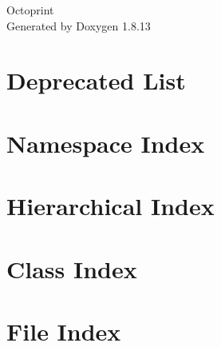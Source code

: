 \documentclass[twoside]{book}
\newcommand{\+}{\discretionary{\mbox{\scriptsize$\hookleftarrow$}}{}{}}
\newcommand{\clearemptydoublepage}{%
  \newpage{\pagestyle{empty}\cleardoublepage}%
}
\begin{document}
\hypersetup{pageanchor=false,
             bookmarksnumbered=true,
             pdfencoding=unicode
            }
\begin{titlepage}
\vspace*{7cm}
\begin{center}%
{\Large Octoprint }\\
\vspace*{1cm}
{\large Generated by Doxygen 1.8.13}\\
\end{center}
\end{titlepage}
\clearemptydoublepage
{}
\tableofcontents
\clearemptydoublepage
{}
\hypersetup{pageanchor=true}

\chapter{Deprecated List}
\label{deprecated}

\chapter{Namespace Index}

\chapter{Hierarchical Index}

\chapter{Class Index}

\chapter{File Index}

\end{document}

